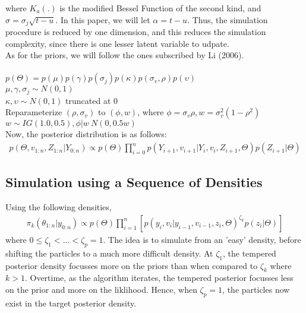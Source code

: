 \documentclass[11pt]{article}
\theoremstyle{definition}
\begin{document}
where $K_{a}(.)$ is the modified Bessel Function of the second kind, and $\sigma = \sigma_{j}\sqrt{t-u}$. In this paper, we will let $\alpha = t-u$. Thus, the simulation procedure is reduced by one dimension, and this reduces the simulation complexity, since there is one lesser latent variable to udpate. \\
As for the priors, we will follow the ones subscribed by Li (2006).\\
\\
$p(\Theta)=p(\mu)p(\gamma)p(\sigma_{j})p(\kappa)p(\sigma_v,\rho)p(\upsilon)$\\
$\mu,\gamma,\sigma_{j} \sim N(0,1)$\\
$\kappa,\upsilon \sim N(0,1)$ truncated at 0\\
Reparameterize $(\rho,\sigma_{v})$ to $(\phi,w)$, where $\phi = \sigma_{v} \rho , w = \sigma_{v}^{2}(1-\rho^{2})$\\
$w \sim IG(1.0,0.5), \phi | w ~ N(0,0.5w)$\\

\noindent Now, the posterior distribution is as follows:
\begin{equation}
\begin{aligned}
p(\Theta,v_{1:n},Z_{1:n}|Y_{0:n}) \propto p(\Theta) \prod_{i=0}^{n} p(Y_{i+1},v_{i+1}|Y_{i},v_{i},Z_{i+1},\Theta)p(Z_{i+1}|\Theta)
\end{aligned}
\end{equation}

\subsection{Simulation using a Sequence of Densities}
Using the following densities,
\begin{equation}
	\begin{aligned}
		\pi_{k}(\theta_{1:n}|y_{0:n}) \propto p(\Theta)\prod_{i=1}^{n}[p(y_{i},v_{i}|y_{i-1},v_{i-1},z_{i},\Theta)^{\zeta_{k}}p(z_{i}|\Theta)] 
	\end{aligned}
\end{equation}
where $0\leqslant\zeta_{1}<...<\zeta_{p}=1.$ 
\noindent The idea is to simulate from an 'easy' density, before shifting the particles to a much more difficult density. At $\zeta_{1}$, the tempered posterior density focusses more on the priors than when compared to $\zeta_{k}$ where $k>1$. Overtime, as the algorithm iterates, the tempered posterior focusses less on the prior and more on the liklihood. Hence, when $\zeta_{p}=1$, the particles now exist in the target posterior density.
\end{document}

